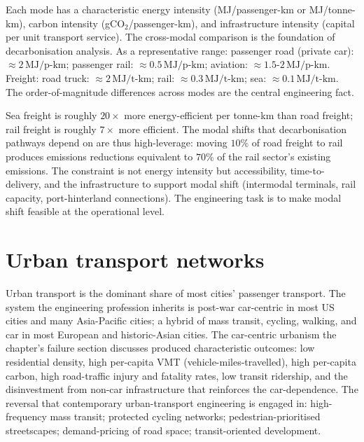 Each mode has a characteristic energy intensity (MJ/passenger-km or MJ/tonne-km), carbon intensity (gCO$_2$/passenger-km), and infrastructure intensity (capital per unit transport service). The cross-modal comparison is the foundation of decarbonisation analysis. As a representative range: passenger road (private car): $\approx 2\,\text{MJ/p-km}$; passenger rail: $\approx 0.5\,\text{MJ/p-km}$; aviation: $\approx 1.5$-$2\,\text{MJ/p-km}$. Freight: road truck: $\approx 2\,\text{MJ/t-km}$; rail: $\approx 0.3\,\text{MJ/t-km}$; sea: $\approx 0.1\,\text{MJ/t-km}$. The order-of-magnitude differences across modes are the central engineering fact.

\begin{archetype}
Sea freight is roughly $20\times$ more energy-efficient per tonne-km than road freight; rail freight is roughly $7\times$ more efficient. The modal shifts that decarbonisation pathways depend on are thus high-leverage: moving $10\%$ of road freight to rail produces emissions reductions equivalent to $70\%$ of the rail sector's existing emissions. The constraint is not energy intensity but accessibility, time-to-delivery, and the infrastructure to support modal shift (intermodal terminals, rail capacity, port-hinterland connections). The engineering task is to make modal shift feasible at the operational level.
\end{archetype}

\section{Urban transport networks}

Urban transport is the dominant share of most cities' passenger transport. The system the engineering profession inherits is post-war car-centric in most US cities and many Asia-Pacific cities; a hybrid of mass transit, cycling, walking, and car in most European and historic-Asian cities. The car-centric urbanism the chapter's failure section discusses produced characteristic outcomes: low residential density, high per-capita VMT (vehicle-miles-travelled), high per-capita carbon, high road-traffic injury and fatality rates, low transit ridership, and the disinvestment from non-car infrastructure that reinforces the car-dependence. The reversal that contemporary urban-transport engineering is engaged in: high-frequency mass transit; protected cycling networks; pedestrian-prioritised streetscapes; demand-pricing of road space; transit-oriented development.

